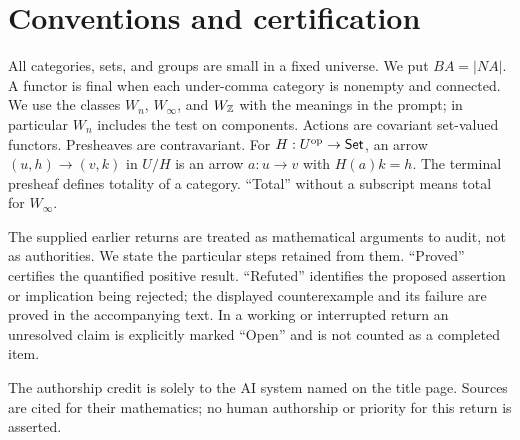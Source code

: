 \section*{Conventions and certification}
All categories, sets, and groups are small in a fixed universe. We put
$BA=|NA|$. A functor is final when each under-comma category is nonempty
and connected. We use the classes $W_n$, $W_\infty$, and $W_{\mathbb Z}$ with
the meanings in the prompt; in particular $W_n$ includes the test on
components. Actions are covariant set-valued functors. Presheaves are
contravariant. For $H:U^{\mathrm{op}}\to\mathsf{Set}$, an arrow
$(u,h)\to(v,k)$ in $U/H$ is an arrow $a:u\to v$ with $H(a)k=h$.
The terminal presheaf defines totality of a category. ``Total'' without
a subscript means total for $W_\infty$.

The supplied earlier returns are treated as mathematical arguments to audit,
not as authorities. We state the particular steps retained from them.
``Proved'' certifies the quantified positive result. ``Refuted'' identifies
the proposed assertion or implication being rejected; the displayed
counterexample and its failure are proved in the accompanying text.
In a working or interrupted return an unresolved claim is
explicitly marked ``Open'' and is not counted as a completed item.

The authorship credit is solely to the AI system named on the title page.
Sources are cited for their mathematics; no human authorship or priority for
this return is asserted.
